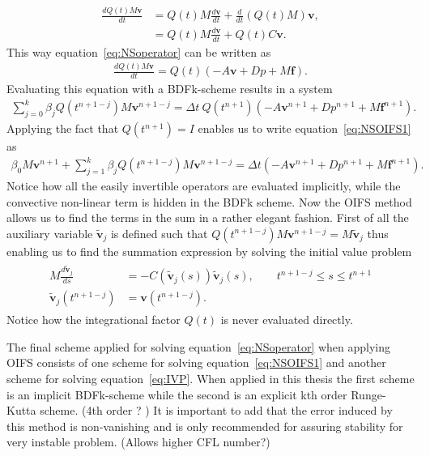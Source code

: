 \begin{align}
    \frac{dQ(t)M\mathbf{v}}{dt} &=  Q(t)M\frac{d\mathbf{v}}{dt} + \frac{d}{dt}(Q(t)M)\mathbf{v},\\
    &= Q(t)M\frac{d\mathbf{v}}{dt} + Q(t)C\mathbf{v}. 
    \label{eq:integrationalfactor}
\end{align}
%
This way equation~\ref{eq:NSoperator} can be written as 
\begin{align}
    \frac{d Q(t)M\mathbf{v}}{dt} =Q(t)( -A\mathbf{v} +D p +M\mathbf{f}).
    \label{eq:NSoperatorOIFS}
\end{align}
Evaluating this equation with a BDFk-scheme results in a system 
\begin{align}
    \sum_{j=0}^{k}\beta_jQ(t^{n+1-j})M\mathbf{v}^{n+1-j} =\Delta t \: Q(t^{n+1})( -A\mathbf{v}^{n+1} +D p^{n+1} +M\mathbf{f}^{n+1}).
    \label{eq:NSOIFS1}
\end{align}
Applying the fact that $Q(t^{n+1}) = I$ enables us to write equation~\ref{eq:NSOIFS1} as 
\begin{align}
    \beta_0M\mathbf{v}^{n+1} + \sum_{j=1}^{k}\beta_jQ(t^{n+1-j})M\mathbf{v}^{n+1-j} 
    =\Delta t ( -A\mathbf{v}^{n+1} +D p^{n+1} +M\mathbf{f}^{n+1}).
    \label{eq:NSOIFS1}
\end{align}
Notice how all the easily invertible operators are evaluated implicitly, while the convective non-linear term is hidden in the BDFk scheme. 
Now the OIFS method allows us to find the terms in the sum in a rather elegant fashion.  
First of all the auxiliary variable $\tilde{\mathbf{v}}_j$ is defined such that $Q(t^{n+1-j})M\mathbf{v}^{n+1-j} = M\tilde{\mathbf{v}}_j$ thus enabling us to find
the summation expression by solving the initial value problem 
\begin{align}
    \begin{split}
    M\frac{d\tilde{\mathbf{v}}_j}{ds} &= -C(\tilde{\mathbf{v}}_j(s))\tilde{\mathbf{v}}_j(s) , \qquad t^{n+1-j}\leq s\leq t^{n+1}\\
    \tilde{\mathbf{v}}_j(t^{n+1-j}) &= \mathbf{v}(t^{n+1-j}).
    \end{split}
    \label{eq:IVP}
\end{align}
Notice how the integrational factor $Q(t)$ is never evaluated directly.

The final scheme applied for solving equation~\ref{eq:NSoperator} when applying OIFS consists of one scheme for solving 
equation~\ref{eq:NSOIFS1} and another scheme for solving equation~\ref{eq:IVP}. When applied in this thesis the 
first scheme is an implicit BDFk-scheme while the second is an explicit kth order Runge-Kutta scheme. (4th order ? )
It is important to add that the error induced by this method is non-vanishing and is only recommended for assuring stability 
for very instable problem. (Allows higher CFL number?)

